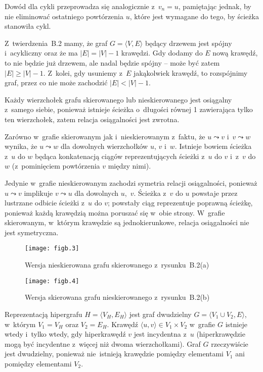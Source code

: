 Dowód dla cykli przeprowadza się analogicznie z~$v_n=u$, pamiętając jednak, by nie eliminować ostatniego powtórzenia $u$, które jest wymagane do tego, by ścieżka stanowiła cykl.

\exercise %
Z~twierdzenia~B.2 mamy, że graf $G=\langle V,E\rangle$ będący drzewem jest spójny i~acykliczny oraz że ma $|E|=|V|-1$ krawędzi. Gdy dodamy do $E$ nową krawędź, to nie będzie już drzewem, ale nadal będzie spójny -- może być zatem $|E|\ge|V|-1$. Z~kolei, gdy usuniemy z~$E$ jakąkolwiek krawędź, to rozspójnimy graf, przez co nie może zachodzić $|E|<|V|-1$.

\exercise %
Każdy wierzchołek grafu skierowanego lub nieskierowanego jest osiągalny z~samego siebie, ponieważ istnieje ścieżka o~długości równej 1 zawierająca tylko ten wierzchołek, zatem relacja osiągalności jest zwrotna.

Zarówno w~grafie skierowanym jak i~nieskierowanym z~faktu, że $u\leadsto v$ i~$v\leadsto w$ wynika, że $u\leadsto w$ dla dowolnych wierzchołków $u$, $v$ i~$w$. Istnieje bowiem ścieżka z~$u$ do $w$ będąca konkatenacją ciągów reprezentujących ścieżki z~$u$ do $v$ i~z~$v$ do $w$ (z~pominięciem powtórzenia $v$ między nimi).

Jedynie w~grafie nieskierowanym zachodzi symetria relacji osiągalności, ponieważ $u\leadsto v$ implikuje $v\leadsto u$ dla dowolnych $u$,~$v$. Ścieżka z~$v$ do $u$ powstaje przez lustrzane odbicie ścieżki z~$u$ do $v$; powstały ciąg reprezentuje poprawną ścieżkę, ponieważ każdą krawędzią można poruszać się w~obie strony. W~grafie skierowanym, w~którym krawędzie są jednokierunkowe, relacja osiągalności nie jest symetryczna.

\exercise %
\begin{figure}[ht]
	\begin{center}
		\texttt{[image: figb.3]}
	\end{center}
	\caption{Wersja nieskierowana grafu skierowanego z~rysunku~B.2(a)}
\end{figure}
\begin{figure}[ht]
	\begin{center}
		\texttt{[image: figb.4]}
	\end{center}
	\caption{Wersja skierowana grafu nieskierowanego z~rysunku~B.2(b)}
\end{figure}

\exercise %
Reprezentacją hipergrafu $H=\langle V_H,E_H\rangle$ jest graf dwudzielny $G=\langle V_1\cup V_2,E\rangle$, w~którym $V_1=V_H$ oraz $V_2=E_H$. Krawędź $\langle u,v\rangle\in V_1\times V_2$ w~grafie $G$ istnieje wtedy i~tylko wtedy, gdy hiperkrawędź $v$ jest incydentna z~$u$ (hiperkrawędzie mogą być incydentne z~więcej niż dwoma wierzchołkami). Graf $G$ rzeczywiście jest dwudzielny, ponieważ nie~istnieją krawędzie pomiędzy elementami $V_1$ ani pomiędzy elementami $V_2$.

